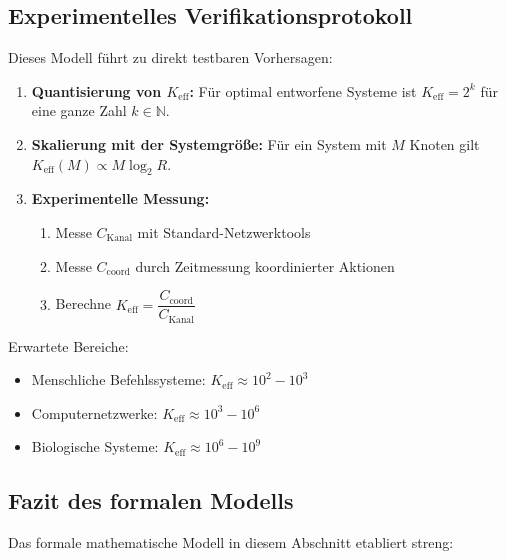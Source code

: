 \documentclass[11pt,a4paper]{article}
\begin{document}
	\subsection{Experimentelles Verifikationsprotokoll}
	
	Dieses Modell führt zu direkt testbaren Vorhersagen:
	
	\begin{enumerate}
		\item \textbf{Quantisierung von $K_{\mathrm{eff}}$:} Für optimal entworfene Systeme ist $K_{\mathrm{eff}} = 2^k$ für eine ganze Zahl $k \in \mathbb{N}$.
		
		\item \textbf{Skalierung mit der Systemgröße:} Für ein System mit $M$ Knoten gilt $K_{\mathrm{eff}}(M) \propto M \log_2 R$.
		
		\item \textbf{Experimentelle Messung:} 
		\begin{enumerate}
			\item Messe $C_{\text{Kanal}}$ mit Standard-Netzwerktools
			\item Messe $C_{\text{coord}}$ durch Zeitmessung koordinierter Aktionen
			\item Berechne $K_{\mathrm{eff}} = \dfrac{C_{\text{coord}}}{C_{\text{Kanal}}}$
		\end{enumerate}
	\end{enumerate}
	
	Erwartete Bereiche:
	\begin{itemize}
		\item Menschliche Befehlssysteme: $K_{\mathrm{eff}} \approx 10^2 - 10^3$
		\item Computernetzwerke: $K_{\mathrm{eff}} \approx 10^3 - 10^6$
		\item Biologische Systeme: $K_{\mathrm{eff}} \approx 10^6 - 10^9$
	\end{itemize}
	
	\subsection{Fazit des formalen Modells}
	
	Das formale mathematische Modell in diesem Abschnitt etabliert streng:
	
\end{document}
